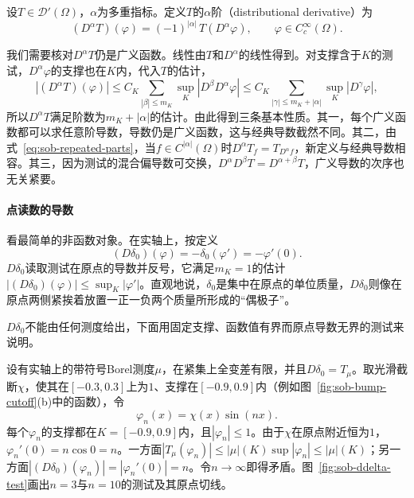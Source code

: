 \begin{definition}[广义导数]
\label{def:sob-distribution-derivative}
设$T\in\mathcal D'(\Omega)$，$\alpha$为多重指标。定义$T$的$\alpha$阶（distributional derivative）为
\begin{equation}
 (D^\alpha T)(\varphi)=(-1)^{|\alpha|}\,T(D^\alpha\varphi),\qquad\varphi\in C_c^\infty(\Omega).
 \label{eq:sob-distribution-derivative}
\end{equation}
\end{definition}

我们需要核对$D^\alpha T$仍是广义函数。线性由$T$和$D^\alpha$的线性得到。对支撑含于$K$的测试，$D^\alpha\varphi$的支撑也在$K$内，代入$T$的估计，
\[
 |(D^\alpha T)(\varphi)|\le C_K\sum_{|\beta|\le m_K}\sup_K|D^{\beta}D^\alpha\varphi|
 \le C_K\sum_{|\gamma|\le m_K+|\alpha|}\sup_K|D^\gamma\varphi| ,
\]
所以$D^\alpha T$满足阶数为$m_K+|\alpha|$的估计。由此得到三条基本性质。其一，每个广义函数都可以求任意阶导数，导数仍是广义函数，这与经典导数截然不同。其二，由式~\eqref{eq:sob-repeated-parts}，当$f\in C^{|\alpha|}(\Omega)$时$D^\alpha T_f=T_{D^\alpha f}$，新定义与经典导数相容。其三，因为测试的混合偏导数可交换，$D^\alpha D^\beta T=D^{\alpha+\beta}T$，广义导数的次序也无关紧要。

\paragraph{点读数的导数}
看最简单的非函数对象。在实轴上，按定义
\[
 (D\delta_0)(\varphi)=-\delta_0(\varphi')=-\varphi'(0).
\]
$D\delta_0$读取测试在原点的导数并反号，它满足$m_K=1$的估计$|(D\delta_0)(\varphi)|\le\sup_K|\varphi'|$。直观地说，$\delta_0$是集中在原点的单位质量，$D\delta_0$则像在原点两侧紧挨着放置一正一负两个质量所形成的“偶极子”。

$D\delta_0$不能由任何测度给出，下面用固定支撑、函数值有界而原点导数无界的测试来说明。

\begin{example}
\label{ex:sob-ddelta-not-measure}
设有实轴上的带符号Borel测度$\mu$，在紧集上全变差有限，并且$D\delta_0=T_\mu$。取光滑截断$\chi$，使其在$[-0.3,0.3]$上为$1$、支撑在$[-0.9,0.9]$内（例如图~\ref{fig:sob-bump-cutoff}(b)中的函数），令
\[
 \varphi_n(x)=\chi(x)\sin(nx).
\]
每个$\varphi_n$的支撑都在$K=[-0.9,0.9]$内，且$|\varphi_n|\le1$。由于$\chi$在原点附近恒为$1$，$\varphi_n'(0)=n\cos0=n$。一方面$|T_\mu(\varphi_n)|\le|\mu|(K)\sup|\varphi_n|\le|\mu|(K)$；另一方面$|(D\delta_0)(\varphi_n)|=|\varphi_n'(0)|=n$。令$n\to\infty$即得矛盾。图~\ref{fig:sob-ddelta-test}画出$n=3$与$n=10$的测试及其原点切线。
\end{example}

